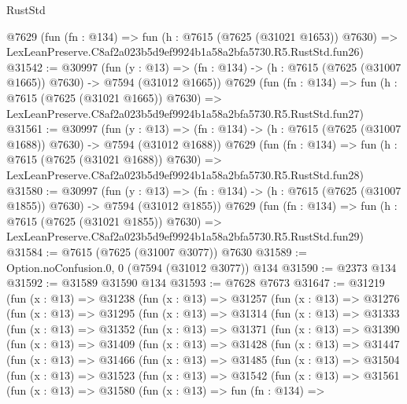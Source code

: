 \begin{lexlean}{RustStd}
\begin{coremodule}
    @7629
    (fun (fn : @134) =>
    fun (h : @7615 (@7625 (@31021 @1653)) @7630) =>
    LexLeanPreserve.C8af2a023b5d9ef9924b1a58a2bfa5730.R5.RustStd.fun26)
@31542 := @30997
    (fun (y : @13) =>
    (fn : @134) -> (h : @7615 (@7625 (@31007 @1665)) @7630) -> @7594 (@31012 @1665))
    @7629
    (fun (fn : @134) =>
    fun (h : @7615 (@7625 (@31021 @1665)) @7630) =>
    LexLeanPreserve.C8af2a023b5d9ef9924b1a58a2bfa5730.R5.RustStd.fun27)
@31561 := @30997
    (fun (y : @13) =>
    (fn : @134) -> (h : @7615 (@7625 (@31007 @1688)) @7630) -> @7594 (@31012 @1688))
    @7629
    (fun (fn : @134) =>
    fun (h : @7615 (@7625 (@31021 @1688)) @7630) =>
    LexLeanPreserve.C8af2a023b5d9ef9924b1a58a2bfa5730.R5.RustStd.fun28)
@31580 := @30997
    (fun (y : @13) =>
    (fn : @134) -> (h : @7615 (@7625 (@31007 @1855)) @7630) -> @7594 (@31012 @1855))
    @7629
    (fun (fn : @134) =>
    fun (h : @7615 (@7625 (@31021 @1855)) @7630) =>
    LexLeanPreserve.C8af2a023b5d9ef9924b1a58a2bfa5730.R5.RustStd.fun29)
@31584 := @7615 (@7625 (@31007 @3077)) @7630
@31589 := Option.noConfusion.{0, 0} (@7594 (@31012 @3077)) @134
@31590 := @2373 @134
@31592 := @31589 @31590 @134
@31593 := @7628 @7673
@31647 := @31219
    (fun (x : @13) =>
    @31238
      (fun (x : @13) =>
      @31257
        (fun (x : @13) =>
        @31276
          (fun (x : @13) =>
          @31295
            (fun (x : @13) =>
            @31314
              (fun (x : @13) =>
              @31333
                (fun (x : @13) =>
                @31352
                  (fun (x : @13) =>
                  @31371
                    (fun (x : @13) =>
                    @31390
                      (fun (x : @13) =>
                      @31409
                        (fun (x : @13) =>
                        @31428
                          (fun (x : @13) =>
                          @31447
                            (fun (x : @13) =>
                            @31466
                              (fun (x : @13) =>
                              @31485
                                (fun (x : @13) =>
                                @31504
                                  (fun (x : @13) =>
                                  @31523
                                    (fun (x : @13) =>
                                    @31542
                                      (fun (x : @13) =>
                                      @31561
                                        (fun (x : @13) =>
                                        @31580
                                          (fun (x : @13) =>
                                          fun (fn : @134) =>

\end{coremodule}
\end{lexlean}
